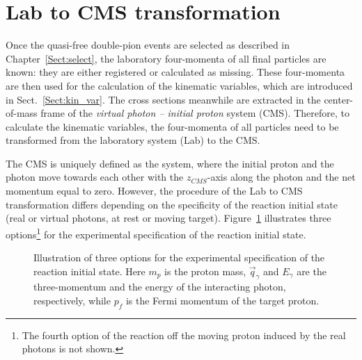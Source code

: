 \section{Lab to CMS transformation}
\label{Sect:lab_cms}

Once the quasi-free double-pion events are selected as described in Chapter~\ref{Sect:select}, the laboratory four-momenta of all final particles are known: they are either registered or calculated as missing. These four-momenta are then used for the calculation of the kinematic variables, which are introduced in Sect.~\ref{Sect:kin_var}. The cross sections meanwhile are extracted in the center-of-mass frame of the {\em virtual photon -- initial proton} system (CMS). Therefore, to calculate the kinematic variables, the four-momenta of all particles need to be transformed from the laboratory system (Lab) to the CMS.

The CMS is uniquely defined as the system, where the initial proton and the photon move towards each other with the $z_{CMS}$-axis along the photon and the net momentum equal to zero. However, the procedure of the Lab to CMS transformation differs depending on the specificity of the reaction initial state (real or virtual photons, at rest or moving target). Figure~\ref{fig:lab_to_CMS} illustrates three options\footnote[4]{The fourth option of the reaction off the moving proton induced by the real photons is not shown.} for the experimental specification of the reaction initial state.%

 
\begin{figure}[!ht]
\begin{center}
\end{center}
\caption{\small  Illustration of three options for the experimental specification of the reaction initial state. Here $m_{p}$ is the proton mass, $\vec q_{\gamma}$ and $E_{\gamma}$ are the three-momentum and the energy of the interacting photon, respectively, while $p_{f}$ is the Fermi momentum of the target proton.}
\label{fig:lab_to_CMS}
\end{figure}


